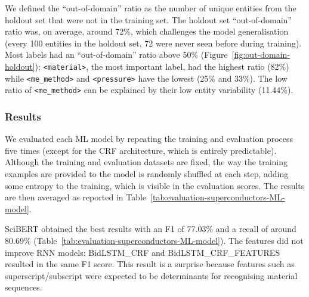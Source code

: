 We defined the ``out-of-domain'' ratio as the number of unique entities from the holdout set that were not in the training set.
The holdout set ``out-of-domain'' ratio was, on average, around 72\%, which challenges the model generalisation (every 100 entities in the holdout set, 72 were never seen before during training).
Most labels had an ``out-of-domain'' ratio above 50\%  (Figure~\ref{fig:out-domain-holdout});  \texttt{<material>}, the most important label, had the highest ratio (82\%) while \texttt{<me\_method>} and \texttt{<pressure>} have the lowest (25\% and 33\%). 
The low ratio of \texttt{<me\_method>} can be explained by their low entity variability (11.44\%).

\subsubsection{Results}
We evaluated each ML model by repeating the training and evaluation process five times (except for the CRF architecture, which is entirely predictable). Although the training and evaluation datasets are fixed, the way the training examples are provided to the model is randomly shuffled at each step, adding some entropy to the training, which is visible in the evaluation scores.
The results are then averaged as reported in Table~\ref{tab:evaluation-superconductors-ML-model}.

SciBERT obtained the best results with an F1 of 77.03\% and a recall of around 80.69\% (Table~\ref{tab:evaluation-superconductors-ML-model}).
The features did not improve RNN models: BidLSTM\_CRF and BidLSTM\_CRF\_FEATURES resulted in the same F1 score.
This result is a surprise because features such as superscript/subscript were expected to be determinants for recognising material sequences.


